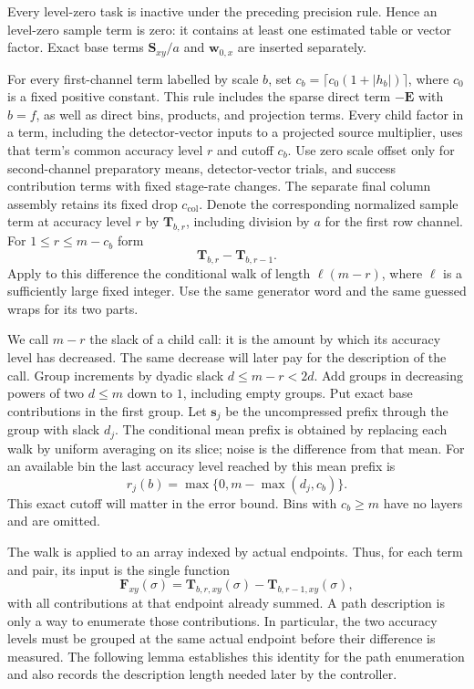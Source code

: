 \documentclass[11pt]{article}
\numberwithin{equation}{section}
\theoremstyle{definition}
\theoremstyle{remark}
\begin{document}
Every level-zero task is inactive under the preceding precision rule.
Hence an level-zero sample term is zero: it contains at least one
estimated table or vector factor.  Exact base terms ${\mathbf{S}}_{xy}/a$ and
${\mathbf{w}}_{0,x}$ are inserted separately.

For every first-channel term labelled by scale $b$, set
$c_b=\lceil c_0(1+|h_b|)\rceil$, where $c_0$ is a fixed positive constant.
This rule includes the sparse direct term $-{\mathbf{E}}$ with $b=f$, as well as
direct bins, products, and projection terms.  Every child factor in a
term, including the detector-vector inputs to a projected source
multiplier, uses that term's common accuracy level ${r}$ and cutoff $c_b$.
Use zero scale offset only for second-channel preparatory means,
detector-vector trials, and success contribution terms with fixed stage-rate changes.
The separate final column assembly retains its fixed drop
$c_{\mathrm{col}}$.  Denote the corresponding normalized
sample term at accuracy level ${r}$ by ${\mathbf{T}}_{b,{r}}$, including division by $a$ for the
first row channel.  For $1\le {r}\le {m}-c_b$ form
\begin{equation}
 {\mathbf{T}}_{b,{r}}-{\mathbf{T}}_{b,{r}-1}.
 \label{eq:est-difference}
\end{equation}
Apply to this difference the conditional walk of length
$\ell({m}-{r})$, where $\ell$ is a sufficiently large fixed integer.  Use the
same generator word and the same guessed wraps for its two parts.

We call ${m}-{r}$ the slack of a child call: it is the amount by which its accuracy level has decreased. The same decrease will later pay for the description of the call. Group increments by dyadic slack
$d\le {m}-{r}<2d$.  Add groups in decreasing powers of two $d\le {m}$ down to
$1$, including empty groups.  Put exact base contributions in the first
group.  Let ${\mathbf{s}}_j$ be the uncompressed prefix through the group with slack
$d_j$.  The conditional mean prefix is obtained by replacing each walk by
uniform averaging on its slice; noise is the difference from that mean.
For an available bin the last accuracy level reached by this mean prefix is
\begin{equation}
 {r}_j(b)=\max\{0,{m}-\max(d_j,c_b)\}.
 \label{eq:est-last-budget}
\end{equation}
This exact cutoff will matter in the error bound.  Bins with $c_b\ge {m}$
have no layers and are omitted.


The walk is applied to an array indexed by actual endpoints.  Thus,
for each term and pair, its input is the single function
\[
 {\mathbf{F}}_{xy}(\sigma)={\mathbf{T}}_{b,{r},xy}(\sigma)-{\mathbf{T}}_{b,{r}-1,xy}(\sigma),
\]
with all contributions at that endpoint already summed.  A path
description is only a way to enumerate those contributions.  In
particular, the two accuracy levels must be grouped at the same actual
endpoint before their difference is measured.  The following lemma
establishes this identity for the path enumeration and also records
the description length needed later by the controller.
\end{document}
